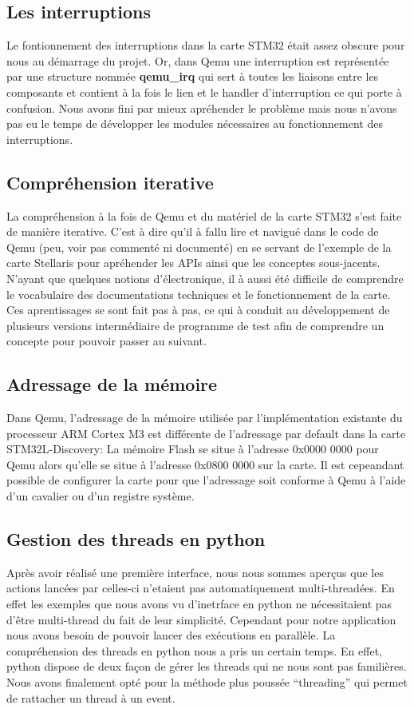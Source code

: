 \documentclass{article}
\begin{document}
	\subsection{Les interruptions}
		 Le fontionnement des interruptions dans la carte STM32 était assez obscure pour nous au démarrage du projet. Or, dans Qemu une 
		 interruption est représentée par une structure nommée \textbf{qemu\_irq} qui sert à toutes les liaisons entre les composants et contient 
		 à la fois le lien et le handler d'interruption ce qui porte à confusion. Nous avons fini par mieux apréhender le problème 
		 mais nous n'avons pas eu le temps de développer les modules nécessaires au fonctionnement des interruptions.

	\subsection{Compréhension iterative}
		 La compréhension à la fois de Qemu et du matériel de la carte STM32 s'est faite de manière iterative. C'est à dire qu'il à fallu 
		 lire et navigué dans le code de Qemu (peu, voir pas commenté ni documenté) en se servant de l'exemple de la carte Stellaris pour 
		 apréhender les APIs ainsi que les conceptes sous-jacents. N'ayant que quelques notions d'électronique, il à aussi été difficile de 
		 comprendre le vocabulaire des documentations techniques et le fonctionnement de la carte.
		 Ces aprentissages se sont fait pas à pas, ce qui à conduit au développement de plusieurs versions intermédiaire de programme de test
		 afin de comprendre un concepte pour pouvoir passer au suivant.
		 
	\subsection{Adressage de la mémoire}
		 Dans Qemu, l'adressage de la mémoire utilisée par l'implémentation existante du processeur ARM Cortex M3 est différente de l'adressage
		 par default dans la carte STM32L-Discovery: La mémoire Flash se situe à l'adresse 0x0000 0000 pour Qemu alors qu'elle se situe
		 à l'adresse 0x0800 0000 sur la carte. Il est cepeandant possible de configurer la carte pour que l'adressage soit conforme à Qemu à l'aide
		 d'un cavalier ou d'un registre système.
	
	\subsection{Gestion des threads en python}
		Après avoir réalisé une première interface, nous nous sommes aperçus que les actions lancées par celles-ci n'etaient pas 
		automatiquement multi-threadées. En effet les exemples que nous avons vu d'inetrface en python ne nécessitaient pas d'être 
		multi-thread du fait de leur simplicité. Cependant pour notre application nous avons besoin de pouvoir lancer des exécutions en parallèle.
		La compréhension des threads en python nous a pris un certain temps. En effet, python dispose de deux façon de gérer les threads 
		qui ne nous sont pas familières.\\
		Nous avons finalement opté pour la méthode plus poussée ``threading'' qui permet de rattacher un thread à un event.
\end{document}
